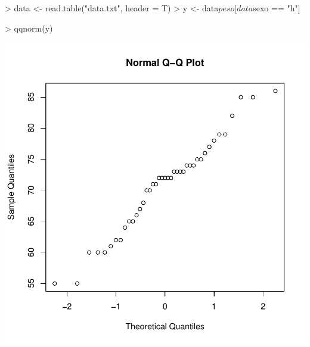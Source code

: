 \documentclass[12pt]{article}
\begin{document}
\begin{Schunk}
\begin{Sinput}
> data <- read.table("data.txt", header = T)
> y <- data$peso[data$sexo == "h"]
\end{Sinput}
\end{Schunk}
\begin{Schunk}
\begin{Sinput}
> qqnorm(y)
\end{Sinput}
\end{Schunk}
\includegraphics{ensayo-021}
  
\end{document}
